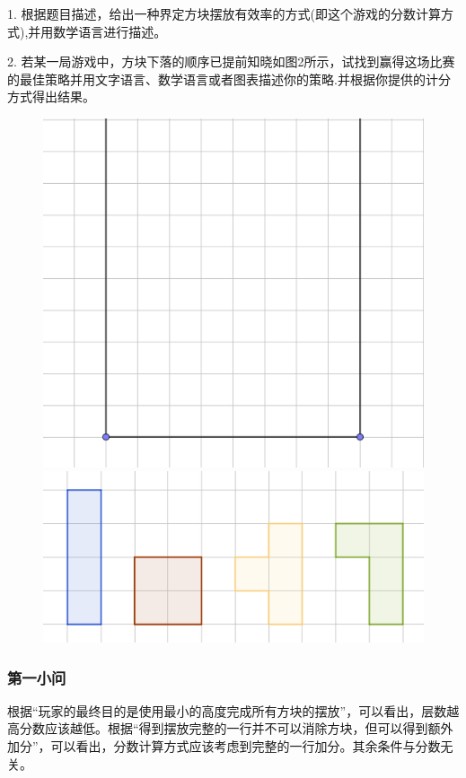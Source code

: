 \documentclass[lang=cn,a4paper]{elegantpaper}
\begin{document}
    1. 根据题目描述，给出一种界定方块摆放有效率的方式(即这个游戏的分数计算方式),并用数学语言进行描述。

    2. 若某一局游戏中，方块下落的顺序已提前知晓如图2所示，试找到赢得这场比赛的最佳策略并用文字语言、数学语言或者图表描述你的策略.并根据你提供的计分方式得出结果。
    \begin{figure}[H]
        \centering
        \includegraphics[scale=0.2]{Container.png}
        \includegraphics[scale=0.4]{basic units.png}
    \end{figure}
    \subsubsection{第一小问}
    根据“玩家的最终目的是使用最小的高度完成所有方块的摆放”，可以看出，层数越高分数应该越低。根据“得到摆放完整的一行并不可以消除方块，但可以得到额外加分”，可以看出，分数计算方式应该考虑到完整的一行加分。其余条件与分数无关。
\end{document}
